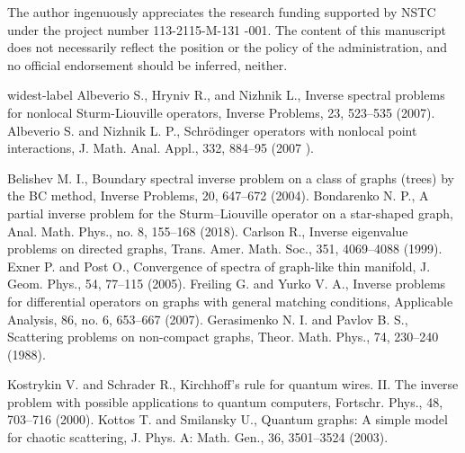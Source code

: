 \documentclass[10pt,a4paper]{article}
\theoremstyle{plain}
\theoremstyle{definition}
\theoremstyle{remark}
\numberwithin{equation}{section}
\newenvironment{acknowledgement}[1][Acknowledgement
]{\begin{trivlist} \item[\hskip \labelsep {\bfseries
#1}]}{\end{trivlist}}
\begin{document}

\begin{acknowledgement}
The author ingenuously appreciates the research funding supported by NSTC under the project number 113-2115-M-131 -001. The content of this manuscript does not necessarily reflect the position or the policy of the administration, and no official endorsement should be inferred, neither.
\end{acknowledgement}

\begin{thebibliography}{widest-label}
Albeverio S., Hryniv R., and Nizhnik L., Inverse spectral problems for nonlocal Sturm-Liouville operators, Inverse Problems, 23, 523--535 (2007).
Albeverio S. and Nizhnik L. P., Schr\"{o}dinger operators with nonlocal point interactions, J. Math. Anal. Appl., 332, 884--95 (2007 ).


Belishev M. I., Boundary spectral inverse problem on a class of graphs (trees) by the BC method, Inverse Problems, 20, 647--672 (2004).
Bondarenko N. P., A partial inverse problem for the Sturm--Liouville operator on a star-shaped graph, Anal. Math.
Phys., no. 8, 155--168 (2018).
Carlson R., Inverse eigenvalue problems on directed graphs, Trans. Amer. Math. Soc., 351, 4069--4088 (1999).
Exner P.  and Post O., Convergence of spectra of graph-like thin manifold, J. Geom. Phys., 54, 77--115 (2005).
Freiling G. and Yurko V. A., Inverse problems for differential operators on graphs with general matching conditions, Applicable Analysis, 86, no. 6, 653--667 (2007).
Gerasimenko N. I. and Pavlov B. S., Scattering problems on non-compact graphs, Theor. Math. Phys., 74, 230--240  (1988).

Kostrykin V. and Schrader R., Kirchhoff's rule for quantum wires. II. The inverse problem with possible applications to quantum computers, Fortschr. Phys., 48, 703--716 (2000).
Kottos T. and Smilansky U., Quantum graphs: A simple model for chaotic scattering, J. Phys. A: Math. Gen., 36, 3501--3524  (2003).


\end{thebibliography}
\end{document}
